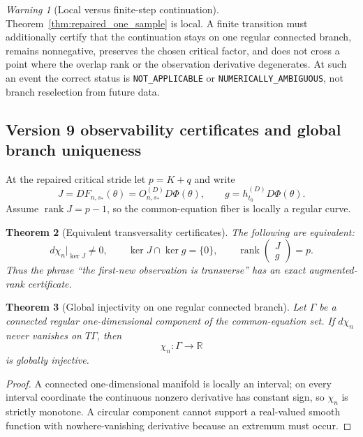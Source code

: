\documentclass[11pt]{amsart}
\numberwithin{equation}{section}
\theoremstyle{plain}
\newtheorem{theorem}{Theorem}[section]
\theoremstyle{definition}
\theoremstyle{remark}
\newtheorem{warning}[theorem]{Warning}
\begin{document}
\begin{warning}[Local versus finite-step continuation]
\label{warn:repaired_local_only}
Theorem~\ref{thm:repaired_one_sample} is local. A finite transition must additionally certify that the continuation stays on one regular connected branch, remains nonnegative, preserves the chosen critical factor, and does not cross a point where the overlap rank or the observation derivative degenerates. At such an event the correct status is \texttt{NOT\_APPLICABLE} or \texttt{NUMERICALLY\_AMBIGUOUS}, not branch reselection from future data.
\end{warning}


\subsection{Version 9 observability certificates and global branch uniqueness}
\label{subsec:v9_observability_certificates}

At the repaired critical stride let $p=K+q$ and write
\[
J=DF_{n,s_*}(\theta)
=O^{(D)}_{n,s_*}D\Phi(\theta),
\qquad
g=h^{(D)}_{t_0}D\Phi(\theta).
\]
Assume $\operatorname{rank}J=p-1$, so the common-equation fiber is locally a regular curve.

\begin{theorem}[Equivalent transversality certificates]
\label{thm:v9_observability_rank}
The following are equivalent:
\[
d\chi_n|_{\ker J}\neq0,
\qquad
\ker J\cap\ker g=\{0\},
\qquad
\boxed{\operatorname{rank}\begin{pmatrix}J\\g\end{pmatrix}=p.}
\]
Thus the phrase ``the first-new observation is transverse'' has an exact augmented-rank
certificate.
\end{theorem}

\begin{theorem}[Global injectivity on one regular connected branch]
\label{thm:v9_global_observability}
Let $\Gamma$ be a connected regular one-dimensional component of the common-equation set.  If
$d\chi_n$ never vanishes on $T\Gamma$, then
\[
\chi_n:\Gamma\longrightarrow\mathbb R
\]
is globally injective.
\end{theorem}

\begin{proof}
A connected one-dimensional manifold is locally an interval; on every interval coordinate the
continuous nonzero derivative has constant sign, so $\chi_n$ is strictly monotone.  A circular
component cannot support a real-valued smooth function with nowhere-vanishing derivative because
an extremum must occur.
\end{proof}
\end{document}
